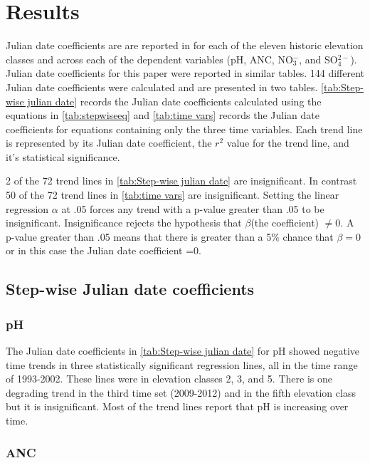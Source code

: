 \section{Results}

Julian date coefficients are are reported in \citet{robinson2008ph} for each of the eleven historic elevation classes and across each of the dependent variables (pH, ANC, NO$_3^-$, and SO$_4^{2-}$).  
Julian date coefficients for this paper were reported in similar tables.  
144 different Julian date coefficients were calculated and are presented in two tables. 
 \autoref{tab:Step-wise julian date} records the Julian date coefficients calculated using the equations in \autoref{tab:stepwiseeq}  and \autoref{tab:time vars} records the Julian date coefficients for  equations containing only the three time variables.  
Each trend line is represented by its Julian date coefficient, the $r^2$ value for the trend line, and it's statistical significance.

2 of the 72 trend lines in \autoref{tab:Step-wise julian date} are insignificant. 
 In contrast 50 of the 72 trend lines in \autoref{tab:time vars} are insignificant.   
Setting the linear regression $\alpha$ at .05 forces any trend with a p-value greater than .05 to be insignificant. 
Insignificance rejects the hypothesis that $\beta$(the coefficient) $\neq 0$.  A p-value greater than .05 means that there is greater than a 5$\%$ chance that $\beta=0$ or in this case the Julian date coefficient =0. 

\subsection{Step-wise Julian date coefficients}

\subsubsection{pH}

The Julian date coefficients in \autoref{tab:Step-wise julian date} for pH showed negative time trends in three statistically significant regression lines, all in the time range of 1993-2002.  
These lines were in elevation classes 2, 3, and 5.  
There is one degrading trend in the third time set (2009-2012) and in the fifth elevation class but it is insignificant.   
Most of the trend lines report that pH is increasing over time.

\subsubsection{ANC}

